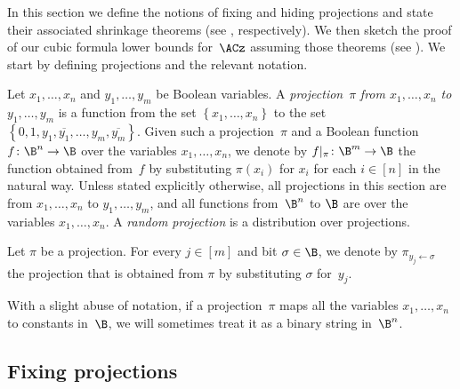 \documentclass{toc}
\begin{document}
In this section we define the notions of fixing and hiding projections
and state their associated shrinkage theorems
(see 
, %
respectively). We then sketch the proof of our cubic formula lower
bounds for~$\ACz$ assuming those theorems (see ).
We start by defining projections and the relevant notation.
\begin{definition}
Let $x_{1},\ldots,x_{n}$ and $y_{1},\ldots,y_{m}$ be Boolean variables.
A \emph{projection}~$\pi$ \emph{from $x_{1},\ldots,x_{n}$ to $y_{1},\ldots,y_{m}$}
is a function from the set $\left\{ x_{1},\ldots,x_{n}\right\} $
to the set $\left\{ 0,1,y_{1},\overline{y_{1}},\ldots,y_{m},\overline{y_{m}}\right\} $.
Given such a projection~$\pi$ and a Boolean function~$f\colon\B^{n}\to\B$
over the variables $x_{1},\ldots,x_{n}$, we denote by $f|_{\pi}\colon\B^{m}\to\B$
the function obtained from~$f$ by substituting $\pi(x_{i})$ for
$x_{i}$ for each $i\in\left[n\right]$ in the natural way. Unless
stated explicitly otherwise, all projections in this section are from
\emph{$x_{1},\ldots,x_{n}$} to $y_{1},\ldots,y_{m}$, and all functions
from~$\B^{n}$ to $\B$ are over the variables $x_{1},\ldots,x_{n}$.
A \emph{random projection} is a distribution over projections. 
\end{definition}

\begin{notation}
Let $\pi$ be a projection. For every $j\in[m]$ and bit $\sigma\in\B$,
we denote by $\pi_{y_{j}\gets\sigma}$ the projection that is obtained
from $\pi$ by substituting $\sigma$ for~$y_{j}$. 
\end{notation}

\begin{notation}
With a slight abuse of notation, if a projection~$\pi$ maps all
the variables $x_{1},\ldots,x_{n}$ to constants in~$\B$, we will
sometimes treat it as a binary string in~$\B^{n}$. 
\end{notation}


\subsection{\label{subsec:Fixing-projections}Fixing projections}
\end{document}
